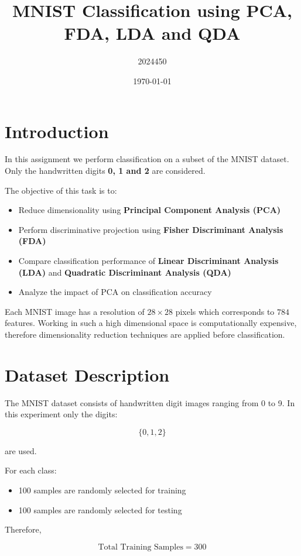 \documentclass[12pt]{article}
\title{MNIST Classification using PCA, FDA, LDA and QDA}
\author{2024450}
\date{\today}
\begin{document}
\maketitle

\section{Introduction}

In this assignment we perform classification on a subset of the MNIST dataset. 
Only the handwritten digits \textbf{0, 1 and 2} are considered. 

The objective of this task is to:

\begin{itemize}
\item Reduce dimensionality using \textbf{Principal Component Analysis (PCA)}
\item Perform discriminative projection using \textbf{Fisher Discriminant Analysis (FDA)}
\item Compare classification performance of \textbf{Linear Discriminant Analysis (LDA)} and \textbf{Quadratic Discriminant Analysis (QDA)}
\item Analyze the impact of PCA on classification accuracy
\end{itemize}

Each MNIST image has a resolution of $28\times28$ pixels which corresponds to $784$ features. Working in such a high dimensional space is computationally expensive, therefore dimensionality reduction techniques are applied before classification.

\section{Dataset Description}

The MNIST dataset consists of handwritten digit images ranging from 0 to 9. 
In this experiment only the digits:

\[
\{0,1,2\}
\]

are used.

For each class:

\begin{itemize}
\item 100 samples are randomly selected for training
\item 100 samples are randomly selected for testing
\end{itemize}

Therefore,

\[
\text{Total Training Samples} = 300
\]
\end{document}
